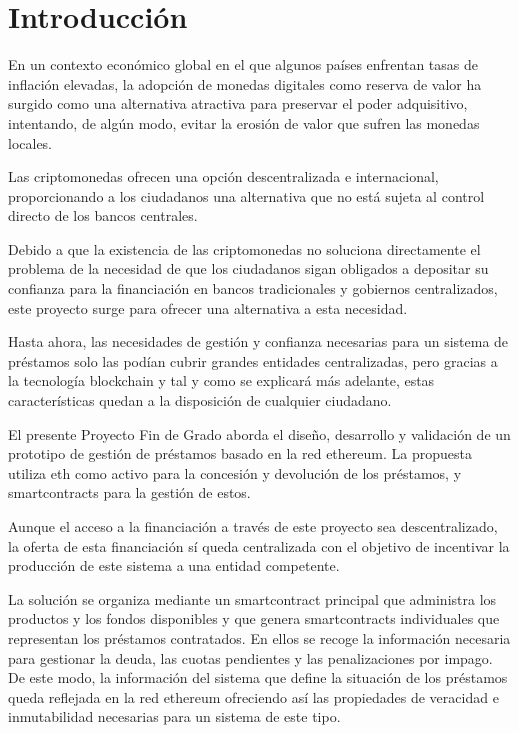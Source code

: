 \chapter{Introducción}
\label{ch:introduccion}

En un contexto económico global en el que algunos países enfrentan tasas de 
inflación elevadas, la adopción de monedas digitales como reserva de valor ha 
surgido como una alternativa atractiva para preservar el poder adquisitivo, 
intentando, de algún modo, evitar la erosión de valor que sufren las monedas locales.

Las criptomonedas ofrecen una opción descentralizada e internacional, 
proporcionando a los ciudadanos una alternativa que no está sujeta al control 
directo de los bancos centrales.

Debido a que la existencia de las criptomonedas no soluciona directamente el 
problema de la 
necesidad de que los ciudadanos sigan obligados a depositar su confianza para la 
financiación en bancos tradicionales y gobiernos centralizados, este proyecto surge 
para ofrecer una alternativa a esta necesidad.

Hasta ahora, las necesidades de gestión y confianza necesarias para un sistema de 
préstamos solo las podían cubrir grandes entidades centralizadas, pero gracias 
a la tecnología \gls{blockchain} y tal y como se explicará más adelante, 
estas características quedan a la disposición 
de cualquier ciudadano. 

El presente Proyecto Fin de Grado aborda el diseño, desarrollo y validación 
de un prototipo de gestión de préstamos basado en la red \gls{ethereum}. 
La propuesta utiliza \gls{eth} como activo para la concesión y devolución de los 
préstamos, y \glspl{smartcontract} para la gestión de estos.

Aunque el acceso a la financiación a través de este proyecto sea descentralizado,
la oferta de esta financiación sí queda centralizada con el objetivo de incentivar 
la producción de este sistema a una entidad competente.

La solución se organiza mediante un \gls{smartcontract} principal que administra los 
productos y los fondos disponibles y que genera \glspl{smartcontract} 
individuales que representan los préstamos contratados. 
En ellos se recoge la información necesaria para gestionar 
la deuda, las cuotas pendientes y las penalizaciones por impago. 
De este modo, la información del sistema que define la situación de los préstamos 
queda reflejada en la red \gls{ethereum} ofreciendo así las propiedades de 
veracidad e inmutabilidad necesarias para un sistema de este tipo.

